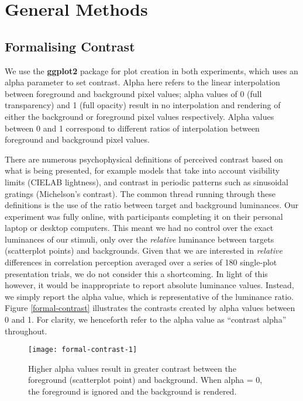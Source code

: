 \documentclass[preprint, 3p,
authoryear]{elsarticle} %
\begin{document}
\hypertarget{general-methods}{%
\section{General Methods}\label{general-methods}}

\hypertarget{formalising-contrast}{%
\subsection{Formalising Contrast}\label{formalising-contrast}}

We use the \textbf{ggplot2} \citep{hadley_gg2016} package for plot
creation in both experiments, which uses an alpha parameter to set
contrast. Alpha here refers to the linear interpolation
\citep{stone_2008} between foreground and background pixel values; alpha
values of 0 (full transparency) and 1 (full opacity) result in no
interpolation and rendering of either the background or foreground pixel
values respectively. Alpha values between 0 and 1 correspond to
different ratios of interpolation between foreground and background
pixel values.

There are numerous psychophysical definitions of perceived contrast
\citep{zuffi_2007} based on what is being presented, for example models
that take into account visibility limits (CIELAB lightness), and
contrast in periodic patterns such as sinusoidal gratings (Michelson's
contrast). The common thread running through these definitions is the
use of the ratio between target and background luminances. Our
experiment was fully online, with participants completing it on their
personal laptop or desktop computers. This meant we had no control over
the exact luminances of our stimuli, only over the \emph{relative}
luminance between targets (scatterplot points) and backgrounds. Given
that we are interested in \emph{relative} differences in correlation
perception averaged over a series of 180 single-plot presentation
trials, we do not consider this a shortcoming. In light of this however,
it would be inappropriate to report absolute luminance values. Instead,
we simply report the alpha value, which is representative of the
luminance ratio. Figure \ref{formal-contrast} illustrates the contrasts
created by alpha values between 0 and 1. For clarity, we henceforth
refer to the alpha value as ``contrast alpha'' throughout.

\begin{figure}

\texttt{[image: formal-contrast-1]} \hfill{}

\caption{\label{formal-contrast}Higher alpha values result in greater contrast between the foreground (scatterplot point) and background. When alpha = 0, the foreground is ignored and the background is rendered.}\label{fig:formal-contrast}
\end{figure}
\end{document}
